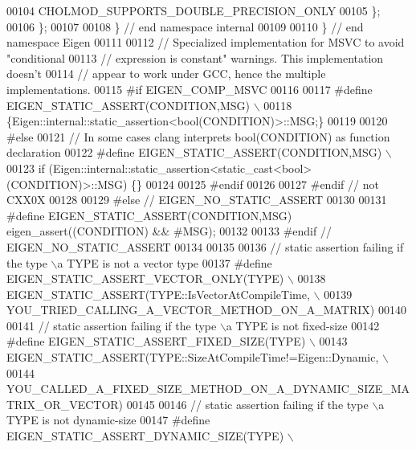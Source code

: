 \begin{DoxyCode}
00104         CHOLMOD\_SUPPORTS\_DOUBLE\_PRECISION\_ONLY
00105       \};
00106     \};
00107 
00108     \} \textcolor{comment}{// end namespace internal}
00109 
00110     \} \textcolor{comment}{// end namespace Eigen}
00111 
00112     \textcolor{comment}{// Specialized implementation for MSVC to avoid "conditional}
00113     \textcolor{comment}{// expression is constant" warnings.  This implementation doesn't}
00114     \textcolor{comment}{// appear to work under GCC, hence the multiple implementations.}
00115 \textcolor{preprocessor}{    #if EIGEN\_COMP\_MSVC}
00116 
00117 \textcolor{preprocessor}{      #define EIGEN\_STATIC\_ASSERT(CONDITION,MSG) \(\backslash\)}
00118 \textcolor{preprocessor}{        \{Eigen::internal::static\_assertion<bool(CONDITION)>::MSG;\}}
00119 
00120 \textcolor{preprocessor}{    #else}
00121       \textcolor{comment}{// In some cases clang interprets bool(CONDITION) as function declaration}
00122 \textcolor{preprocessor}{      #define EIGEN\_STATIC\_ASSERT(CONDITION,MSG) \(\backslash\)}
00123 \textcolor{preprocessor}{        if (Eigen::internal::static\_assertion<static\_cast<bool>(CONDITION)>::MSG) \{\}}
00124 
00125 \textcolor{preprocessor}{    #endif}
00126 
00127 \textcolor{preprocessor}{  #endif // not CXX0X}
00128 
00129 \textcolor{preprocessor}{#else // EIGEN\_NO\_STATIC\_ASSERT}
00130 
00131 \textcolor{preprocessor}{  #define EIGEN\_STATIC\_ASSERT(CONDITION,MSG) eigen\_assert((CONDITION) && #MSG);}
00132 
00133 \textcolor{preprocessor}{#endif // EIGEN\_NO\_STATIC\_ASSERT}
00134 
00135 
00136 \textcolor{comment}{// static assertion failing if the type \(\backslash\)a TYPE is not a vector type}
00137 \textcolor{preprocessor}{#define EIGEN\_STATIC\_ASSERT\_VECTOR\_ONLY(TYPE) \(\backslash\)}
00138 \textcolor{preprocessor}{  EIGEN\_STATIC\_ASSERT(TYPE::IsVectorAtCompileTime, \(\backslash\)}
00139 \textcolor{preprocessor}{                      YOU\_TRIED\_CALLING\_A\_VECTOR\_METHOD\_ON\_A\_MATRIX)}
00140 
00141 \textcolor{comment}{// static assertion failing if the type \(\backslash\)a TYPE is not fixed-size}
00142 \textcolor{preprocessor}{#define EIGEN\_STATIC\_ASSERT\_FIXED\_SIZE(TYPE) \(\backslash\)}
00143 \textcolor{preprocessor}{  EIGEN\_STATIC\_ASSERT(TYPE::SizeAtCompileTime!=Eigen::Dynamic, \(\backslash\)}
00144 \textcolor{preprocessor}{                      YOU\_CALLED\_A\_FIXED\_SIZE\_METHOD\_ON\_A\_DYNAMIC\_SIZE\_MATRIX\_OR\_VECTOR)}
00145 
00146 \textcolor{comment}{// static assertion failing if the type \(\backslash\)a TYPE is not dynamic-size}
00147 \textcolor{preprocessor}{#define EIGEN\_STATIC\_ASSERT\_DYNAMIC\_SIZE(TYPE) \(\backslash\)}

\end{DoxyCode}
